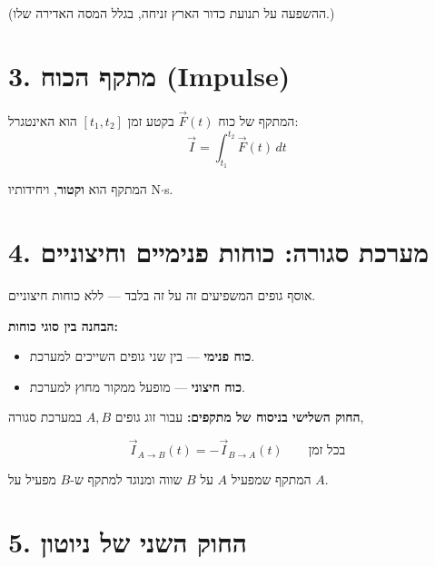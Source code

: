 \documentclass[12pt, a4paper]{article}
\newcommand{\hvec}[1]{\overrightarrow{#1}}
\begin{document}
(ההשפעה על תנועת כדור הארץ זניחה, בגלל המסה האדירה שלו.)

\section*{3. מתקף הכוח (\textenglish{Impulse})}

\begin{tcolorbox}[defbox, title={מתקף}]
המתקף של כוח \textenglish{$\hvec{F}(t)$} בקטע זמן \textenglish{$[t_1, t_2]$} הוא האינטגרל:
\[
  \hvec{I} = \int_{t_1}^{t_2} \hvec{F}(t)\,dt
\]
\end{tcolorbox}

המתקף הוא \textbf{וקטור}, ויחידותיו \textenglish{N$\cdot$s}.

\section*{4. מערכת סגורה: כוחות פנימיים וחיצוניים}

\begin{tcolorbox}[defbox, title={מערכת סגורה}]
אוסף גופים המשפיעים זה על זה בלבד --- ללא כוחות חיצוניים.
\end{tcolorbox}

\textbf{הבחנה בין סוגי כוחות:}
\begin{itemize}
  \item \textbf{כוח פנימי} --- בין שני גופים השייכים למערכת.
  \item \textbf{כוח חיצוני} --- מופעל ממקור מחוץ למערכת.
\end{itemize}

\medskip

\textbf{החוק השלישי בניסוח של מתקפים:} עבור זוג גופים \textenglish{$A, B$} במערכת סגורה,

\begin{tcolorbox}[resultbox]
\[
  \hvec{I}_{A \to B}(t) = -\hvec{I}_{B \to A}(t)
  \qquad \text{בכל זמן}
\]
\end{tcolorbox}

המתקף שמפעיל \textenglish{$A$} על \textenglish{$B$} שווה ומנוגד למתקף ש-\textenglish{$B$} מפעיל על \textenglish{$A$}.

\section*{5. החוק השני של ניוטון}
\end{document}

